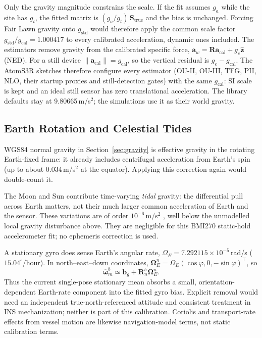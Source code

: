 \documentclass[conference]{IEEEtran}
\begin{document}
    Only the gravity magnitude constrains the scale. If the fit assumes
    $g_a$ while the site has $g_t$, the fitted matrix is
    $(g_a/g_t)\,\mathbf{S}_\text{true}$ and the bias is unchanged. Forcing
    Fair Lawn gravity onto $g_\text{std}$ would therefore apply the common
    scale factor $g_\text{std}/g_\text{cal} = 1.000417$ to every calibrated
    acceleration, dynamic ones included. The estimators remove gravity from
    the calibrated specific force, $\mathbf{a}_w = \mathbf{R}\mathbf{a}_\text{cal}
    + g_e\hat{\mathbf{z}}$ (NED). For a still device
    $\|\mathbf{a}_\text{cal}\| = g_\text{cal}$, so the vertical residual is
    $g_e - g_\text{cal}$. The AtomS3R sketches therefore configure every
    estimator (OU-II, OU-III, TFG, PII, NLO, their startup proxies and
    still-detection gates) with the same $g_\text{cal}$: SI scale is kept
    and an ideal still sensor has zero translational acceleration. The
    library defaults stay at 9.80665\,m/s$^2$; the simulations use it as
    their world gravity.

    \subsection{Earth Rotation and Celestial Tides}

    WGS84 normal gravity in Section~\ref{sec:gravity} is effective
    gravity in the rotating Earth-fixed frame: it already includes
    centrifugal acceleration from Earth's spin (up to about
    $0.034$\,m/s$^2$ at the equator). Applying this correction again
    would double-count it.

    The Moon and Sun contribute time-varying \emph{tidal} gravity:
    the differential pull across Earth matters, not their much
    larger common acceleration of Earth and the sensor. These
    variations are of order $10^{-6}$\,m/s$^2$
    \cite{IERS2010}, well below the unmodelled local gravity
    disturbance above. They are negligible for this BMI270
    static-hold accelerometer fit; no ephemeris correction is used.

    A stationary gyro does sense Earth's angular rate,
    $\Omega_E=7.292115\times10^{-5}$\,rad/s
    ($15.04^\circ$/hour). In north--east--down coordinates,
    $\boldsymbol{\Omega}_E^n=
    \Omega_E(\cos\varphi,0,-\sin\varphi)^\top$, so
    \begin{equation}
        \overline{\boldsymbol{\omega}}_m^b \simeq
        \mathbf{b}_g + \mathbf{R}_n^b\boldsymbol{\Omega}_E^n.
    \end{equation}
    Thus the current single-pose stationary mean absorbs a small,
    orientation-dependent Earth-rate component into the fitted
    gyro bias. Explicit removal would need an independent
    true-north-referenced attitude and consistent treatment in
    INS mechanization; neither is part of this calibration.
    Coriolis and transport-rate effects from vessel motion are
    likewise navigation-model terms, not static calibration terms.
\end{document}
